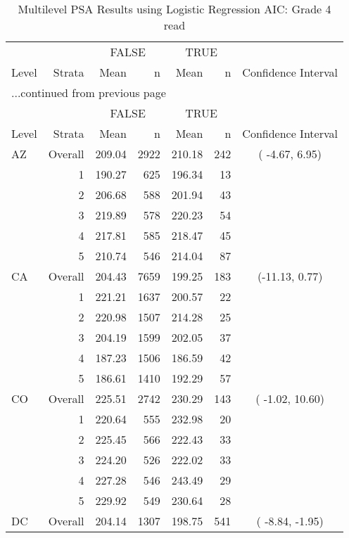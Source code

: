 \begin{longtable}{lrrr@{\extracolsep{.25cm}}rrc}
\caption{Multilevel PSA Results using Logistic Regression AIC: Grade 4 read} \\ 
   \hline & & \multicolumn{2}{c}{FALSE} & \multicolumn{2}{c}{TRUE} & \\ \cline{3-4} \cline{5-6} Level & Strata & Mean & n & Mean & n & Confidence Interval \\ \hline\endfirsthead \multicolumn{7}{l}{{...continued from previous page}}\\ \hline  & & \multicolumn{2}{c}{FALSE} & \multicolumn{2}{c}{TRUE} & \\ \cline{3-4} \cline{5-6} Level & Strata & Mean & n & Mean & n & Confidence Interval \\ \hline \endhead \endfoot \endlastfoot  \hline
AZ & Overall & 209.04 & 2922 & 210.18 & 242 & ( -4.67,   6.95) \\ 
   & 1 & 190.27 & 625 & 196.34 &  13 &  \\ 
   & 2 & 206.68 & 588 & 201.94 &  43 &  \\ 
   & 3 & 219.89 & 578 & 220.23 &  54 &  \\ 
   & 4 & 217.81 & 585 & 218.47 &  45 &  \\ 
   & 5 & 210.74 & 546 & 214.04 &  87 &  \\ 
   \hline
CA & Overall & 204.43 & 7659 & 199.25 & 183 & (-11.13,   0.77) \\ 
   & 1 & 221.21 & 1637 & 200.57 &  22 &  \\ 
   & 2 & 220.98 & 1507 & 214.28 &  25 &  \\ 
   & 3 & 204.19 & 1599 & 202.05 &  37 &  \\ 
   & 4 & 187.23 & 1506 & 186.59 &  42 &  \\ 
   & 5 & 186.61 & 1410 & 192.29 &  57 &  \\ 
   \hline
CO & Overall & 225.51 & 2742 & 230.29 & 143 & ( -1.02,  10.60) \\ 
   & 1 & 220.64 & 555 & 232.98 &  20 &  \\ 
   & 2 & 225.45 & 566 & 222.43 &  33 &  \\ 
   & 3 & 224.20 & 526 & 222.02 &  33 &  \\ 
   & 4 & 227.28 & 546 & 243.49 &  29 &  \\ 
   & 5 & 229.92 & 549 & 230.64 &  28 &  \\ 
   \hline
DC & Overall & 204.14 & 1307 & 198.75 & 541 & ( -8.84,  -1.95) \\ 

\end{longtable}
